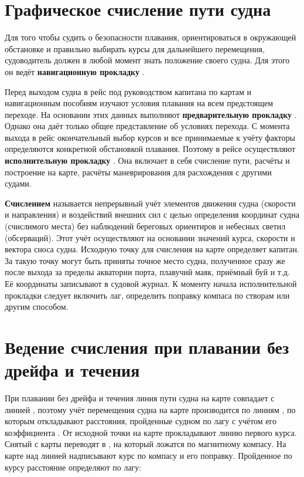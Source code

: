 \section{Графическое счисление пути судна}

Для того чтобы судить о безопасности плавания, ориентироваться в
окружающей обстановке и правильно выбирать курсы для дальнейшего
перемещения, судоводитель должен в любой момент знать положение своего
судна. Для этого он ведёт \textbf{навигационную прокладку}
.

Перед выходом судна в рейс под руководством капитана по картам и
навигационным пособиям изучают условия плавания на всем предстоящем
переходе. На основании этих данных выполняют \textbf{предварительную
  прокладку} . Однако она даёт только
общее представление об условиях перехода. С момента выхода в рейс
окончательный выбор курсов и все принимаемые к учёту факторы
определяются конкретной обстановкой плавания. Поэтому в рейсе
осуществляют \textbf{исполнительную прокладку}
. Она включает в себя счисление пути,
расчёты и построение на карте, расчёты маневрирования для расхождения
с другими судами.

\textbf{Счислением} называется
непрерывный учёт элементов движения судна (скорости и направления) и
воздействий внешних сил с целью определения координат судна
(счислимого места) без наблюдений береговых ориентиров и небесных
светил (обсерваций). Этот учёт осуществляют на основании значений
курса, скорости и вектора сноса судна. Исходную точку для счисления на
карте определяет капитан. За такую точку могут быть приняты точное
место судна, полученное сразу же после выхода за пределы акватории
порта, плавучий маяк, приёмный буй и т.д. Её координаты записывают в
судовой журнал. К моменту начала исполнительной прокладки следует
включить лаг, определить поправку компаса по створам или другим
способом.

\section{Ведение счисления при плавании без дрейфа и течения}

При плавании без дрейфа и течения линия пути судна на карте совпадает
с линией \IK, поэтому учёт перемещения судна на карте производится по
линиям \IK, по которым откладывают расстояния, пройденные судном по
лагу с учётом его коэффициента . От исходной точки на карте
прокладывают линию первого курса. Снятый с карты \IK переводят в \KK,
на который ложатся по магнитному компасу. На карте над линией \IK
надписывают курс по компасу и его поправку. Пройденное по курсу
расстояние  определяют по лагу:

